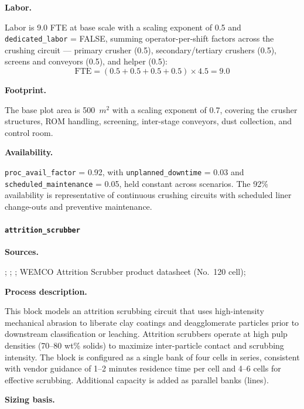 \medskip
\noindent\textbf{Labor.}\quad

Labor is 9.0 FTE at base scale with a scaling exponent of 0.5 and \texttt{dedicated\_labor} = FALSE, summing operator-per-shift factors across the crushing circuit --- primary crusher (0.5), secondary/tertiary crushers (0.5), screens and conveyors (0.5), and helper (0.5):
\[
	\text{FTE} = (0.5 + 0.5 + 0.5 + 0.5) \times 4.5 = 9.0
\]

\medskip
\noindent\textbf{Footprint.}\quad

The base plot area is 500~$\si{m^2}$ with a scaling exponent of 0.7, covering the crusher structures, ROM handling, screening, inter-stage conveyors, dust collection, and control room.

\medskip
\noindent\textbf{Availability.}\quad

\texttt{proc\_avail\_factor} = 0.92, with \texttt{unplanned\_downtime} = 0.03 and \texttt{scheduled\_maintenance} = 0.05, held constant across scenarios. The 92\% availability is representative of continuous crushing circuits with scheduled liner change-outs and preventive maintenance.

\clearpage
\paragraph{\texttt{attrition\_scrubber}}\label{app:04-methods-blockdefs-attritionscrubber}

\medskip
\noindent\textbf{Sources.}\quad

\citet{laneNI43101Technical2024}; \citet{sgscanadaincSK1300Technical2024}; \citet{riordanTonopahLithiumClaims2023}; \citet{flsmidthWEMCOAttritionScrubber2023} WEMCO Attrition Scrubber product datasheet (No.\ 120 cell); \citet{ulrichGuideChemicalEngineering1984}

\medskip
\noindent\textbf{Process description.}\quad

This block models an attrition scrubbing circuit that uses high-intensity mechanical abrasion to liberate clay coatings and deagglomerate particles prior to downstream classification or leaching. Attrition scrubbers operate at high pulp densities (70--80 wt\% solids) to maximize inter-particle contact and scrubbing intensity. The block is configured as a single bank of four cells in series, consistent with vendor guidance of 1--2 minutes residence time per cell and 4--6 cells for effective scrubbing. Additional capacity is added as parallel banks (lines).

\medskip
\noindent\textbf{Sizing basis.}\quad

